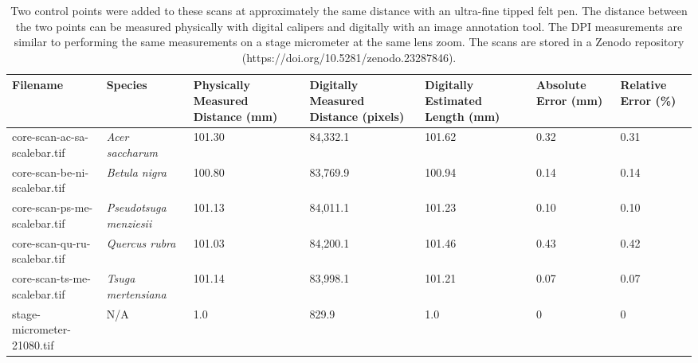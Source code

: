 \begin{table}[htbp]
    \centering
    \begin{tabular}{ |p{2.8cm}||p{2.5cm}|p{1.8cm}|p{2.0cm}|p{1.8cm}|p{1.6cm}|p{1.6cm}|}
        \hline
        \hline
        Filename & Species & Physically Measured Distance (mm) & Digitally Measured Distance (pixels) & Digitally Estimated Length (mm) & Absolute Error (mm) & Relative Error (\%) \\
        \hline
        core-scan-ac-sa-scalebar.tif & \textit{Acer saccharum} & 101.30 & 84,332.1 & 101.62 & 0.32 & 0.31 \\ %
        core-scan-be-ni-scalebar.tif & \textit{Betula nigra} &  100.80 & 83,769.9 & 100.94 & 0.14 & 0.14 \\ %
        core-scan-ps-me-scalebar.tif & \textit{Pseudotsuga menziesii} &  101.13 & 84,011.1 & 101.23 & 0.10 & 0.10 \\ %
        core-scan-qu-ru-scalebar.tif & \textit{Quercus rubra} &  101.03 & 84,200.1 & 101.46 & 0.43 & 0.42\\ %
        core-scan-ts-me-scalebar.tif & \textit{Tsuga mertensiana}  & 101.14 & 83,998.1 & 101.21 & 0.07 & 0.07 \\ %
        stage-micrometer-21080.tif & N/A & 1.0 & 829.9 & 1.0 & 0 & 0\\
        \hline
    \end{tabular}
    \caption{Two control points were added to these scans at approximately the same distance with an ultra-fine tipped felt pen. The distance between the two points can be measured physically with digital calipers and digitally with an image annotation tool. The DPI measurements are similar to performing the same measurements on a stage micrometer at the same lens zoom. The scans are stored in a Zenodo repository (https://doi.org/10.5281/zenodo.23287846).} %
    \label{tab:scans_control_points}
\end{table}